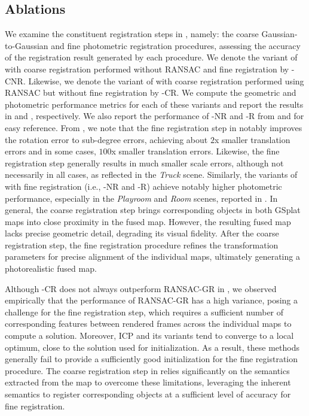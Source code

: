 \subsection{Ablations}
We examine the constituent registration steps in \algname, namely: the coarse Gaussian-to-Gaussian and fine photometric registration procedures, assessing the accuracy of the registration result generated by each procedure. We denote the variant of \algname with coarse registration performed without RANSAC and fine registration by \algname-CNR. Likewise, we denote the variant of \algname with coarse registration performed using RANSAC but without fine registration by \algname-CR. We compute the geometric and photometric performance metrics for each of these variants and report the results in  and , respectively. We also report the performance of \algname-NR and \algname-R from  and  for easy reference.  From , we note that the fine registration step in \algname notably improves the rotation error to sub-degree errors, achieving about $2$x smaller translation errors and in some cases, $100$x smaller translation errors. Likewise, the fine registration step generally results in much smaller scale errors, although not necessarily in all cases, as reflected in the \emph{Truck} scene.
Similarly, the variants of \algname with fine registration (i.e., \algname-NR and \algname-R) achieve notably higher photometric performance, especially in the \emph{Playroom} and \emph{Room} scenes, reported in . 
In general, the coarse registration step brings corresponding objects in both GSplat maps into close proximity in the fused map. However, the resulting fused map lacks precise geometric detail, degrading its visual fidelity. After the coarse registration step, the fine registration procedure refines the transformation parameters for precise alignment of the individual maps, ultimately generating a photorealistic fused map.

Although \algname-CR does not always outperform RANSAC-GR in , we observed empirically that the performance of RANSAC-GR has a high variance, posing a challenge for the fine registration step, which requires a sufficient number of corresponding features between rendered frames across the individual maps to compute a solution. Moreover, ICP and its variants tend to converge to a local optimum, close to the solution used for initialization. As a result, these methods generally fail to provide a sufficiently good initialization for the fine registration procedure. The coarse registration step in \algname relies significantly on the semantics extracted from the map to overcome these limitations, leveraging the inherent semantics to register corresponding objects at a sufficient level of accuracy for fine registration.


